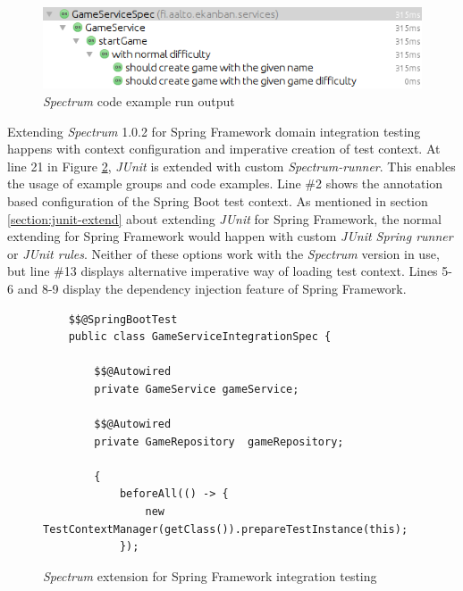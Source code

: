     \begin{figure}[H]
      \begin{center}
        \begin{topbot}[style=mdstyle]
        \includegraphics[width=\textwidth]{images/spectrum-result.png}
        \end{topbot}
        \caption{\textit{Spectrum} code example run output}
        \label{fig:spectrum-result}
      \end{center}
    \end{figure}

    Extending \textit{Spectrum} 1.0.2 for Spring Framework domain integration testing happens with context configuration and imperative
    creation of test context. At line 21 in Figure \ref{fig:spectrum-init}, \textit{JUnit} is extended with custom \textit{Spectrum-runner}.
    This enables the usage of example groups and code examples. Line \#2 shows the annotation based configuration of the Spring Boot
    test context. As mentioned in section \ref{section:junit-extend} about extending \textit{JUnit} for Spring Framework,
    the normal extending for Spring Framework would
    happen with custom \textit{JUnit Spring runner} or \textit{JUnit rules}. Neither of these options work with the \textit{Spectrum} version in use,
    but line \#13 displays alternative imperative way of loading test context. Lines 5-6 and 8-9 display the dependency
    injection feature of Spring Framework.

    \begin{figure}[H]
    \begin{lstlisting}[style=java]
    %%@RunWith%%(Spectrum.class)
    $$@SpringBootTest
    public class GameServiceIntegrationSpec {

        $$@Autowired
        private GameService gameService;

        $$@Autowired
        private GameRepository  gameRepository;

        {
            beforeAll(() -> {
                new TestContextManager(getClass()).prepareTestInstance(this);
            });
    \end{lstlisting}
        \caption{\textit{Spectrum} extension for Spring Framework integration testing}
        \label{fig:spectrum-init}
    \end{figure}

